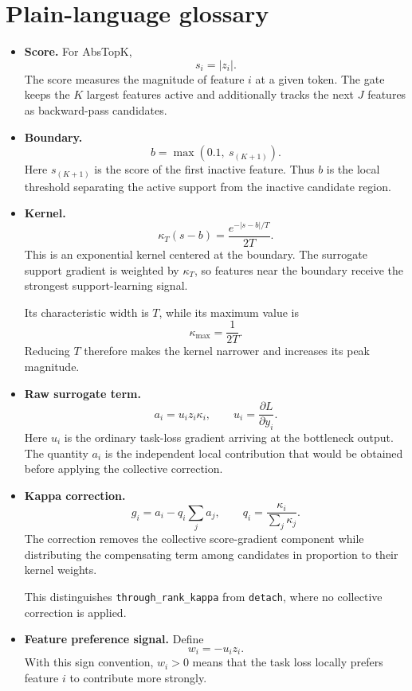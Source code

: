 \documentclass[11pt,a4paper]{article}
\newcommand{\code}[1]{\texttt{#1}}
\begin{document}
\section{Plain-language glossary}

\begin{itemize}[leftmargin=1.4em]

\item \textbf{Score.}
For AbsTopK,
\[
s_i = |z_i|.
\]
The score measures the magnitude of feature \(i\) at a given token.
The gate keeps the \(K\) largest features active and additionally tracks the
next \(J\) features as backward-pass candidates.

\item \textbf{Boundary.}
\[
b = \max\left(0.1,\ s_{(K+1)}\right).
\]
Here \(s_{(K+1)}\) is the score of the first inactive feature.
Thus \(b\) is the local threshold separating the active support from the
inactive candidate region.

\item \textbf{Kernel.}
\[
\kappa_T(s-b)
=
\frac{e^{-|s-b|/T}}{2T}.
\]
This is an exponential kernel centered at the boundary.
The surrogate support gradient is weighted by \(\kappa_T\), so features near
the boundary receive the strongest support-learning signal.

Its characteristic width is \(T\), while its maximum value is
\[
\kappa_{\max}=\frac{1}{2T}.
\]
Reducing \(T\) therefore makes the kernel narrower and increases its peak
magnitude.

\item \textbf{Raw surrogate term.}
\[
a_i = u_i z_i \kappa_i,
\qquad
u_i = \frac{\partial L}{\partial y_i}.
\]
Here \(u_i\) is the ordinary task-loss gradient arriving at the bottleneck
output. The quantity \(a_i\) is the independent local contribution that would
be obtained before applying the collective correction.

\item \textbf{Kappa correction.}
\[
g_i
=
a_i - q_i \sum_j a_j,
\qquad
q_i
=
\frac{\kappa_i}{\sum_j \kappa_j}.
\]
The correction removes the collective score-gradient component while
distributing the compensating term among candidates in proportion to their
kernel weights.

This distinguishes \code{through\_rank\_kappa} from \code{detach}, where no
collective correction is applied.

\item \textbf{Feature preference signal.}
Define
\[
w_i=-u_i z_i.
\]
With this sign convention, \(w_i>0\) means that the task loss locally prefers
feature \(i\) to contribute more strongly.


\end{itemize}
\end{document}
